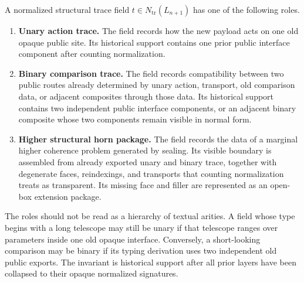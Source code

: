 \begin{definition}
A normalized structural trace field \(t\in N_{\mathrm{tr}}(L_{n+1})\) has one of the following
roles.

\begin{enumerate}
\item \textbf{Unary action trace.}  The field records how the new payload acts on one old
opaque public site.  Its historical support contains one prior public interface component
after counting normalization.

\item \textbf{Binary comparison trace.}  The field records compatibility between two public
routes already determined by unary action, transport, old comparison data, or adjacent
composites through those data.  Its historical support contains two independent public
interface components, or an adjacent binary composite whose two components remain visible in
normal form.

\item \textbf{Higher structural horn package.}  The field records the data of a marginal
higher coherence problem generated by sealing.  Its visible boundary is assembled from
already exported unary and binary trace, together with degenerate faces, reindexings, and
transports that counting normalization treats as transparent.  Its missing face and filler are
represented as an open-box extension package.
\end{enumerate}
\end{definition}

The roles should not be read as a hierarchy of textual arities.  A field whose type begins
with a long telescope may still be unary if that telescope ranges over parameters inside one
old opaque interface.  Conversely, a short-looking comparison may be binary if its typing
derivation uses two independent old public exports.  The invariant is historical support after
all prior layers have been collapsed to their opaque normalized signatures.

